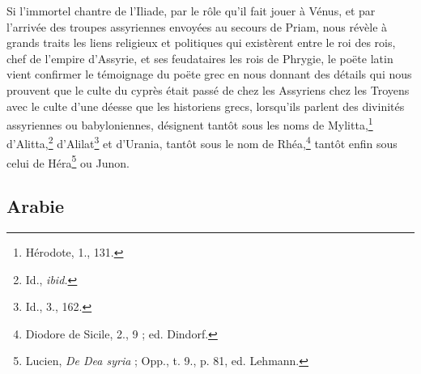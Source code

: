 \documentclass[a4paper, 11pt, oneside, polutonikogreek, french]{article}
\begin{document}
Si l'immortel chantre de l'Iliade, par le rôle qu'il fait jouer à Vénus, et par l'arrivée des troupes assyriennes envoyées au secours de Priam, nous révèle à grands traits les liens religieux et politiques qui existèrent entre le roi des rois, chef de l'empire d'Assyrie, et ses feudataires les rois de Phrygie, le poëte latin vient confirmer le témoignage du poëte grec en nous donnant des détails qui nous prouvent que le culte du cyprès était passé de chez les Assyriens chez les Troyens avec le culte d'une déesse que les historiens grecs, lorsqu'ils parlent des divinités assyriennes ou babyloniennes, désignent tantôt sous les noms de Mylitta,\footnote{Hérodote, 1., 131.} d'Alitta,\footnote{Id., \emph{ibid.}} d'Alilat\footnote{Id., 3., 162.} et d'Urania, tantôt sous le nom de Rhéa,\footnote{Diodore de Sicile, 2., 9 ; ed. Dindorf.} tantôt enfin sous celui de Héra\footnote{Lucien, \emph{De Dea syria} ; Opp., t. 9., p. 81, ed. Lehmann.} ou Junon.
\clearpage
\subsection{Arabie}
\end{document}
